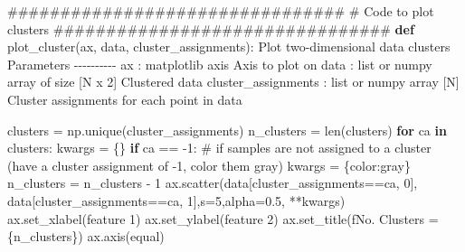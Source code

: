 \documentclass[
  letterpaper,
  DIV=11,
  numbers=noendperiod]{scrartcl}
\newenvironment{Shaded}{\begin{snugshade}}{\end{snugshade}}
\newcommand{\BuiltInTok}[1]{\textcolor[rgb]{0.00,0.23,0.31}{#1}}
\newcommand{\CommentTok}[1]{\textcolor[rgb]{0.37,0.37,0.37}{#1}}
\newcommand{\ControlFlowTok}[1]{\textcolor[rgb]{0.00,0.23,0.31}{\textbf{#1}}}
\newcommand{\DecValTok}[1]{\textcolor[rgb]{0.68,0.00,0.00}{#1}}
\newcommand{\FloatTok}[1]{\textcolor[rgb]{0.68,0.00,0.00}{#1}}
\newcommand{\KeywordTok}[1]{\textcolor[rgb]{0.00,0.23,0.31}{\textbf{#1}}}
\newcommand{\NormalTok}[1]{\textcolor[rgb]{0.00,0.23,0.31}{#1}}
\newcommand{\OperatorTok}[1]{\textcolor[rgb]{0.37,0.37,0.37}{#1}}
\newcommand{\SpecialCharTok}[1]{\textcolor[rgb]{0.37,0.37,0.37}{#1}}
\newcommand{\SpecialStringTok}[1]{\textcolor[rgb]{0.13,0.47,0.30}{#1}}
\newcommand{\StringTok}[1]{\textcolor[rgb]{0.13,0.47,0.30}{#1}}
\begin{document}
\begin{Shaded}
\begin{Highlighting}[]
\CommentTok{\#\#\#\#\#\#\#\#\#\#\#\#\#\#\#\#\#\#\#\#\#\#\#\#\#\#\#\#\#\#\#\#}
\CommentTok{\# Code to plot clusters}
\CommentTok{\#\#\#\#\#\#\#\#\#\#\#\#\#\#\#\#\#\#\#\#\#\#\#\#\#\#\#\#\#\#\#\#}
\KeywordTok{def}\NormalTok{ plot\_cluster(ax, data, cluster\_assignments):}
    \CommentTok{\textquotesingle{}\textquotesingle{}\textquotesingle{}Plot two{-}dimensional data clusters}
\CommentTok{    }
\CommentTok{    Parameters}
\CommentTok{    {-}{-}{-}{-}{-}{-}{-}{-}{-}{-}}
\CommentTok{    ax : matplotlib axis}
\CommentTok{        Axis to plot on}
\CommentTok{    data : list or numpy array of size [N x 2] }
\CommentTok{        Clustered data}
\CommentTok{    cluster\_assignments : list or numpy array [N]}
\CommentTok{        Cluster assignments for each point in data}

\CommentTok{    \textquotesingle{}\textquotesingle{}\textquotesingle{}}
\NormalTok{    clusters }\OperatorTok{=}\NormalTok{ np.unique(cluster\_assignments)}
\NormalTok{    n\_clusters }\OperatorTok{=} \BuiltInTok{len}\NormalTok{(clusters)}
    \ControlFlowTok{for}\NormalTok{ ca }\KeywordTok{in}\NormalTok{ clusters:}
\NormalTok{        kwargs }\OperatorTok{=}\NormalTok{ \{\}}
        \ControlFlowTok{if}\NormalTok{ ca }\OperatorTok{==} \OperatorTok{{-}}\DecValTok{1}\NormalTok{:}
            \CommentTok{\# if samples are not assigned to a cluster (have a cluster assignment of {-}1, color them gray)}
\NormalTok{            kwargs }\OperatorTok{=}\NormalTok{ \{}\StringTok{\textquotesingle{}color\textquotesingle{}}\NormalTok{:}\StringTok{\textquotesingle{}gray\textquotesingle{}}\NormalTok{\}}
\NormalTok{            n\_clusters }\OperatorTok{=}\NormalTok{ n\_clusters }\OperatorTok{{-}} \DecValTok{1}
\NormalTok{        ax.scatter(data[cluster\_assignments}\OperatorTok{==}\NormalTok{ca, }\DecValTok{0}\NormalTok{], data[cluster\_assignments}\OperatorTok{==}\NormalTok{ca, }\DecValTok{1}\NormalTok{],s}\OperatorTok{=}\DecValTok{5}\NormalTok{,alpha}\OperatorTok{=}\FloatTok{0.5}\NormalTok{, }\OperatorTok{**}\NormalTok{kwargs)}
\NormalTok{        ax.set\_xlabel(}\StringTok{\textquotesingle{}feature 1\textquotesingle{}}\NormalTok{)}
\NormalTok{        ax.set\_ylabel(}\StringTok{\textquotesingle{}feature 2\textquotesingle{}}\NormalTok{)}
\NormalTok{        ax.set\_title(}\SpecialStringTok{f\textquotesingle{}No. Clusters = }\SpecialCharTok{\{}\NormalTok{n\_clusters}\SpecialCharTok{\}}\SpecialStringTok{\textquotesingle{}}\NormalTok{)}
\NormalTok{        ax.axis(}\StringTok{\textquotesingle{}equal\textquotesingle{}}\NormalTok{)}
\end{Highlighting}
\end{Shaded}
\end{document}
